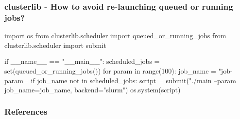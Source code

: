 \documentclass[11pt,compress,serif]{beamer}
\begin{document}
\begin{frame}[fragile=singleslide]
\frametitle{clusterlib - How to avoid re-launching queued or running jobs?}
    

\begin{pythoncode}
import os
from clusterlib.scheduler import queued_or_running_jobs
from clusterlib.scheduler import submit

if __name__ == "__main__":
    scheduled_jobs = set(queued_or_running_jobs())
    for param in range(100):
        job_name = "job-param=%
        if job_name not in scheduled_jobs:
            script = submit("./main --param %
                            job_name=job_name,
                            backend="slurm")
            os.system(script)
\end{pythoncode}

\end{frame}

   

\begin{frame}[allowframebreaks]%
\frametitle{References} 

{\footnotesize
    
    
}
\end{frame}
\end{document}
